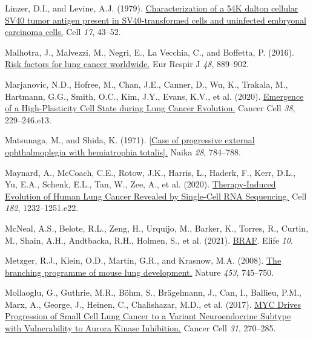 \begin{CSLReferences}{0}{0}
\leavevmode{}%
Linzer, D.I., and Levine, A.J. (1979). \href{https://doi.org/10.1016/0092-8674(79)90293-9}{Characterization of a 54K dalton cellular SV40 tumor antigen present in SV40-transformed cells and uninfected embryonal carcinoma cells.} Cell \emph{17}, 43--52.

\leavevmode{}%
Malhotra, J., Malvezzi, M., Negri, E., La Vecchia, C., and Boffetta, P. (2016). \href{https://doi.org/10.1183/13993003.00359-2016}{Risk factors for lung cancer worldwide.} Eur Respir J \emph{48}, 889--902.

\leavevmode{}%
Marjanovic, N.D., Hofree, M., Chan, J.E., Canner, D., Wu, K., Trakala, M., Hartmann, G.G., Smith, O.C., Kim, J.Y., Evans, K.V., et al. (2020). \href{https://doi.org/10.1016/j.ccell.2020.06.012}{Emergence of a High-Plasticity Cell State during Lung Cancer Evolution.} Cancer Cell \emph{38}, 229--246.e13.

\leavevmode{}%
Matsunaga, M., and Shida, K. (1971). \href{https://www.ncbi.nlm.nih.gov/pubmed/5130083}{{[}Case of progressive external ophthalmoplegia with hemiatrophia totalis{]}.} Naika \emph{28}, 784--788.

\leavevmode{}%
Maynard, A., McCoach, C.E., Rotow, J.K., Harris, L., Haderk, F., Kerr, D.L., Yu, E.A., Schenk, E.L., Tan, W., Zee, A., et al. (2020). \href{https://doi.org/10.1016/j.cell.2020.07.017}{Therapy-Induced Evolution of Human Lung Cancer Revealed by Single-Cell RNA Sequencing.} Cell \emph{182}, 1232--1251.e22.

\leavevmode{}%
McNeal, A.S., Belote, R.L., Zeng, H., Urquijo, M., Barker, K., Torres, R., Curtin, M., Shain, A.H., Andtbacka, R.H., Holmen, S., et al. (2021). \href{https://doi.org/10.7554/elife.70385}{BRAF}. Elife \emph{10}.

\leavevmode{}%
Metzger, R.J., Klein, O.D., Martin, G.R., and Krasnow, M.A. (2008). \href{https://doi.org/10.1038/nature07005}{The branching programme of mouse lung development.} Nature \emph{453}, 745--750.

\leavevmode{}%
Mollaoglu, G., Guthrie, M.R., Böhm, S., Brägelmann, J., Can, I., Ballieu, P.M., Marx, A., George, J., Heinen, C., Chalishazar, M.D., et al. (2017). \href{https://doi.org/10.1016/j.ccell.2016.12.005}{MYC Drives Progression of Small Cell Lung Cancer to a Variant Neuroendocrine Subtype with Vulnerability to Aurora Kinase Inhibition.} Cancer Cell \emph{31}, 270--285.


\end{CSLReferences}
